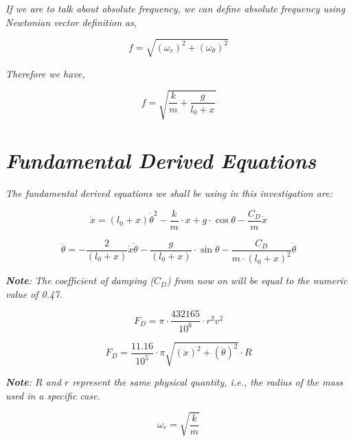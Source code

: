         \textit{If we are to talk about absolute frequency, we can define absolute frequency using Newtonian vector definition as,}
                
            $$f = \sqrt{\left(\omega_r\right)^2 + \left(\omega_\theta\right)^2}$$
                
        \textit{Therefore we have,}
                
            $$f = \sqrt{\frac{k}{m} + \frac{g}{l_0 + x}}$$



\section{\textit{Fundamental Derived Equations}}
\textit{The fundamental derived equations we shall be using in this investigation are:}
            
    \begin{equation}
        \ddot{x} = (l_0+x)\dot{\theta}^2 - \frac{k}{m}\cdot x + g\cdot\cos{\theta} - \frac{C_D}{m}\dot{x}
        \label{eq1}
    \end{equation}
            
    \begin{equation}
        \ddot{\theta} = - \frac{2}{(l_0+x)}\dot{x}\dot{\theta} - \frac{g}{(l_0+x)}\cdot\sin{\theta} - \frac{C_D}{m\cdot(l_0+x)^2}\dot{\theta}
    \label{eq2}
    \end{equation}
            
        \textit{\textbf{Note}: The coefficient of damping ($C_D$) from now on will be equal to the numeric value of 0.47.}
            
    \begin{equation}
        F_D = \pi\cdot\frac{432165}{10^{6}}\cdot r^2v^2
        \label{eq3}
    \end{equation}
            
    \begin{equation}
        F_D = \frac{11.16}{10^{5}}\cdot\pi\sqrt{(\ddot{x})^2 + (\ddot{\theta})^2}\cdot R
        \label{eq4}
    \end{equation}
            
        \textit{\textbf{Note}: $R$ and $r$ represent the same physical quantity, i.e., the radius of the mass used in a specific case.}
            
    \begin{equation}
        \omega_r = \sqrt{\frac{k}{m}}
        \label{eq5}
    \end{equation}
            
